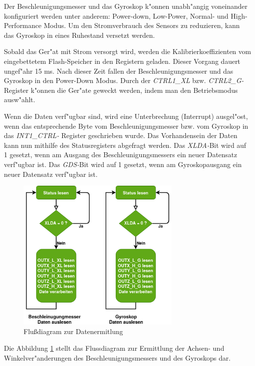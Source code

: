 Der Beschleunigungsmesser und das Gyroskop k"onnen unabh"angig 
voneinander konfiguriert werden unter anderem: Power-down, Low-Power, 
Normal- und High-Performance Modus. Um den Stromverbrauch des Sensors 
zu reduzieren, kann das Gyroskop in eines Ruhestand versetzt werden.


Sobald das Ger"at mit Strom versorgt wird, werden die 
Kalibrierkoeffizienten vom eingebettetem Flash-Speicher in den  
Registern geladen. Dieser Vorgang dauert ungef"ahr 15 ms. Nach dieser 
Zeit fallen der Beschleunigungsmesser und das Gyroskop in den Power-Down 
Modus. Durch der \textit{CTRL1\_XL} bzw. \textit{CTRL2\_G-}Register 
k"onnen die Ger"ate geweckt werden, indem man den Betriebsmodus 
ausw"ahlt.

Wenn die Daten verf"ugbar sind, wird eine Unterbrechung (Interrupt) 
ausgel"ost, wenn das entsprechende Byte vom 
Beschleunigungsmesser bzw. vom Gyroskop in das \textit{INT1\_CTRL-} 
Register geschrieben wurde. Das Vorhandensein der Daten kann nun mithilfe 
des Statusregisters abgefragt werden. Das \textit{XLDA-}Bit wird 
auf 1 gesetzt, wenn am Ausgang des Beschleunigungsmessers ein neuer 
Datensatz verf"ugbar ist. Das \textit{GDS-}Bit wird auf 1 gesetzt, wenn 
am Gyroskopausgang ein neuer Datensatz verf"ugbar ist.

\begin{figure}[h]
	\centering
	\includegraphics[width=8cm]{source/images/Gy_Acc_data}
	\caption{Flu\ss{}diagram zur Datenermitlung}\label{Gy_Acc_data}
\end{figure}

Die Abbildung \ref{Gy_Acc_data} stellt das Flussdiagram zur Ermittlung 
der Achsen- und Winkelver"anderungen des Beschleunigungsmessers und des 
Gyroskops dar.

\vspace{10cm}

